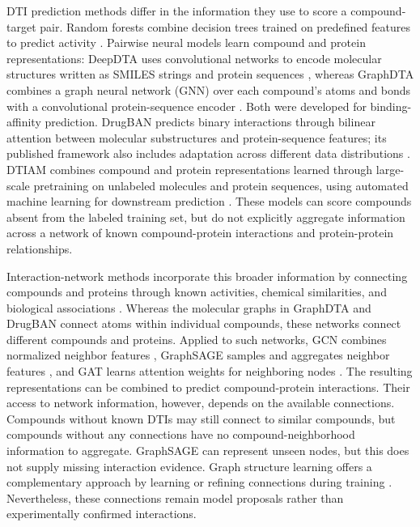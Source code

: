 \documentclass[10pt,letterpaper]{article}
\begin{document}
DTI prediction methods differ in the information they use to score a compound-target pair. Random forests combine decision trees trained on predefined features to predict activity \cite{breiman2001random, svetnik2003random, mayr2018large}. Pairwise neural models learn compound and protein representations: DeepDTA uses convolutional networks to encode molecular structures written as SMILES strings and protein sequences \cite{ozturk2018deepdta}, whereas GraphDTA combines a graph neural network (GNN) over each compound's atoms and bonds with a convolutional protein-sequence encoder \cite{nguyen2021graphdta}. Both were developed for binding-affinity prediction. DrugBAN predicts binary interactions through bilinear attention between molecular substructures and protein-sequence features; its published framework also includes adaptation across different data distributions \cite{bai2023interpretable}. 
DTIAM combines compound and protein representations learned through large-scale pretraining on unlabeled molecules and protein sequences, using automated machine learning for downstream prediction \cite{lu2025dtiam}. These models can score compounds absent from the labeled training set, but do not explicitly aggregate information across a network of known compound-protein interactions and protein-protein relationships.

Interaction-network methods incorporate this broader information by connecting compounds and proteins through known activities, chemical similarities, and biological associations \cite{gaudelet2021utilizing, zhong2025knowledge, perdomoquinteiro2024knowledge}. Whereas the molecular graphs in GraphDTA and DrugBAN connect atoms within individual compounds, these networks connect different compounds and proteins. Applied to such networks, GCN combines normalized neighbor features \cite{kipf2017semi}, GraphSAGE samples and aggregates neighbor features \cite{hamilton2017inductive}, and GAT learns attention weights for neighboring nodes \cite{velickovic2018graph}. The resulting representations can be combined to predict compound-protein interactions. Their access to network information, however, depends on the available connections.
Compounds without known DTIs may still connect to similar compounds, but compounds without any connections have no compound-neighborhood information to aggregate. GraphSAGE can represent unseen nodes, but this does not supply missing interaction evidence. Graph structure learning offers a complementary approach by learning or refining connections during training \cite{zhu2021deep, jin2020graph, chen2020iterative, fatemi2021slaps}. Nevertheless, these connections remain model proposals rather than experimentally confirmed interactions.
\end{document}
